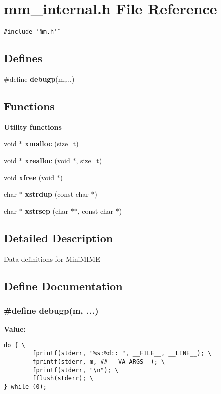 \section{mm\_\-internal.h File Reference}
\label{mm__internal_8h}
{\tt \#include \char`\"{}mm.h\char`\"{}}\par
\subsection*{Defines}
\begin{CompactItemize}
\item 
\#define \textbf{debugp}(m,...)
\end{CompactItemize}
\subsection*{Functions}
\begin{Indent}{\bf Utility functions}\par
\begin{CompactItemize}
\item 
void $\ast$ {\bf xmalloc} (size\_\-t)
\item 
void $\ast$ {\bf xrealloc} (void $\ast$, size\_\-t)
\item 
void \textbf{xfree} (void $\ast$)\label{group__util_g35c4383ff0dee2de18985e6edfed1ae6}

\item 
char $\ast$ \textbf{xstrdup} (const char $\ast$)\label{group__util_g2961ae74e91b0b28acdf9822438a581c}

\item 
char $\ast$ {\bf xstrsep} (char $\ast$$\ast$, const char $\ast$)
\end{CompactItemize}
\end{Indent}


\subsection{Detailed Description}
Data definitions for Mini\-MIME 

\subsection{Define Documentation}
\subsubsection{\setlength{\rightskip}{0pt plus 5cm}\#define debugp(m,  {\em ...})}\label{mm__internal_8h_089dd7bda22f552c35ebdc06a8849c56}


\textbf{Value:}

\begin{Code}\begin{verbatim}do { \
        fprintf(stderr, "%s:%d:: ", __FILE__, __LINE__); \
        fprintf(stderr, m, ## __VA_ARGS__); \
        fprintf(stderr, "\n"); \
        fflush(stderr); \
} while (0);
\end{verbatim}\end{Code}
